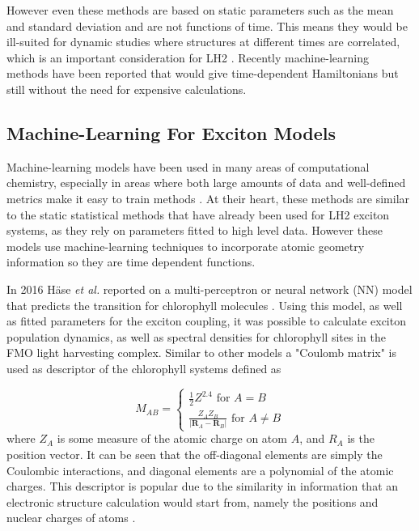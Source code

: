 However even these methods are based on static parameters such as the mean and standard
deviation and are not functions of time. This means they would be ill-suited for
dynamic studies where structures at different times are correlated, which is an important
consideration for LH2 \cite{Papiz2003}. Recently machine-learning methods have been
reported that would give time-dependent Hamiltonians but still without the need 
for expensive calculations.

\subsection{Machine-Learning For Exciton Models}
\label{subsec:machine_learning} 

Machine-learning models have been used in many areas of computational chemistry,
especially in areas where both large amounts of data and well-defined metrics make 
it easy to train  methods \cite{Dral2020, Behler2011, Westermayr2020, Schutt2019, Sajjan2022}.
At their heart, these methods are similar to the static statistical methods that
have already been used for LH2 exciton systems, as they rely on parameters fitted to
high level data. However these models use machine-learning techniques to incorporate 
atomic geometry information so they are time dependent functions.

In 2016 H\"{a}se \emph{et al.} reported on a multi-perceptron or neural network (NN)
model that predicts the \Qy transition for chlorophyll molecules \cite{AspuruGuzik2016}.
Using this model, as well as fitted parameters for the exciton coupling, it was 
possible to calculate exciton population dynamics, as well as spectral densities
for chlorophyll sites in the FMO light harvesting complex. Similar to other models
a "Coulomb matrix" \cite{Rupp2012a, Montavon2013} is used as descriptor of the chlorophyll
systems defined as 

\begin{equation}
	M_{AB} = 
	  \begin{cases}
		\frac{1}{2} Z^{2.4} \text{ for } A = B\\
		\frac{Z_A Z_B}{\left\lvert \mathbf{R}_A - \mathbf{R}_B\right\rvert} \text{ for } A \neq B
	  \end{cases}
\end{equation}
%
where $Z_A$ is some measure of the atomic charge on atom $A$, and $R_A$ is the position
vector. It can be seen that the off-diagonal elements are simply the Coulombic interactions,
and diagonal elements are a polynomial of the atomic charges. This descriptor is
popular due to the similarity in information that an electronic structure calculation
would start from, namely the positions and nuclear charges of atoms \cite{Raghunathan2022}.

